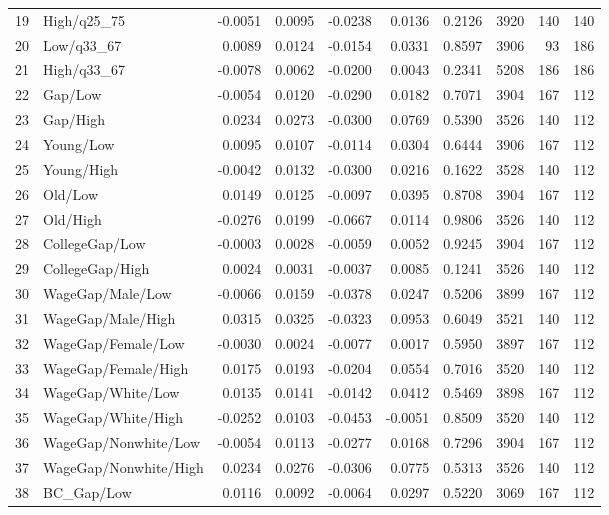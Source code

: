 \begin{table}[ht]
\begin{tabular}{rlrrrrrrrr}
  19 & High/q25\_75 & -0.0051 & 0.0095 & -0.0238 & 0.0136 & 0.2126 & 3920 & 140 & 140 \\ 
  20 & Low/q33\_67 & 0.0089 & 0.0124 & -0.0154 & 0.0331 & 0.8597 & 3906 & 93 & 186 \\ 
  21 & High/q33\_67 & -0.0078 & 0.0062 & -0.0200 & 0.0043 & 0.2341 & 5208 & 186 & 186 \\ 
  22 & Gap/Low & -0.0054 & 0.0120 & -0.0290 & 0.0182 & 0.7071 & 3904 & 167 & 112 \\ 
  23 & Gap/High & 0.0234 & 0.0273 & -0.0300 & 0.0769 & 0.5390 & 3526 & 140 & 112 \\ 
  24 & Young/Low & 0.0095 & 0.0107 & -0.0114 & 0.0304 & 0.6444 & 3906 & 167 & 112 \\ 
  25 & Young/High & -0.0042 & 0.0132 & -0.0300 & 0.0216 & 0.1622 & 3528 & 140 & 112 \\ 
  26 & Old/Low & 0.0149 & 0.0125 & -0.0097 & 0.0395 & 0.8708 & 3904 & 167 & 112 \\ 
  27 & Old/High & -0.0276 & 0.0199 & -0.0667 & 0.0114 & 0.9806 & 3526 & 140 & 112 \\ 
  28 & CollegeGap/Low & -0.0003 & 0.0028 & -0.0059 & 0.0052 & 0.9245 & 3904 & 167 & 112 \\ 
  29 & CollegeGap/High & 0.0024 & 0.0031 & -0.0037 & 0.0085 & 0.1241 & 3526 & 140 & 112 \\ 
  30 & WageGap/Male/Low & -0.0066 & 0.0159 & -0.0378 & 0.0247 & 0.5206 & 3899 & 167 & 112 \\ 
  31 & WageGap/Male/High & 0.0315 & 0.0325 & -0.0323 & 0.0953 & 0.6049 & 3521 & 140 & 112 \\ 
  32 & WageGap/Female/Low & -0.0030 & 0.0024 & -0.0077 & 0.0017 & 0.5950 & 3897 & 167 & 112 \\ 
  33 & WageGap/Female/High & 0.0175 & 0.0193 & -0.0204 & 0.0554 & 0.7016 & 3520 & 140 & 112 \\ 
  34 & WageGap/White/Low & 0.0135 & 0.0141 & -0.0142 & 0.0412 & 0.5469 & 3898 & 167 & 112 \\ 
  35 & WageGap/White/High & -0.0252 & 0.0103 & -0.0453 & -0.0051 & 0.8509 & 3520 & 140 & 112 \\ 
  36 & WageGap/Nonwhite/Low & -0.0054 & 0.0113 & -0.0277 & 0.0168 & 0.7296 & 3904 & 167 & 112 \\ 
  37 & WageGap/Nonwhite/High & 0.0234 & 0.0276 & -0.0306 & 0.0775 & 0.5313 & 3526 & 140 & 112 \\ 
  38 & BC\_Gap/Low & 0.0116 & 0.0092 & -0.0064 & 0.0297 & 0.5220 & 3069 & 167 & 112 \\ 

\end{tabular}
\end{table}
